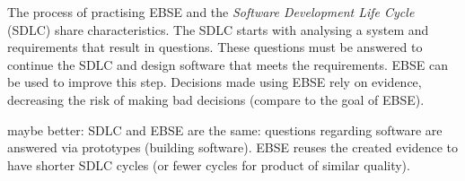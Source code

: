 \newline




The process of practising EBSE and the \emph{Software Development Life Cycle} (SDLC) share characteristics. The SDLC starts with analysing a system and requirements that result in questions. These questions must be answered to continue the SDLC and design software that meets the requirements. EBSE can be used to improve this step. Decisions made using EBSE rely on evidence, decreasing the risk of making bad decisions (compare to the goal of EBSE).

maybe better: SDLC and EBSE are the same: questions regarding software are answered via prototypes (building software). EBSE reuses the created evidence to have shorter SDLC cycles (or fewer cycles for product of similar quality).


